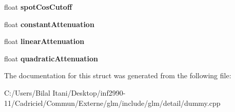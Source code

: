 \begin{DoxyCompactItemize}
\item 
float {\bfseries spot\+Cos\+Cutoff}\hypertarget{structlight_a25376f0a1e32235d50ef14edfa18bfb3}{}\label{structlight_a25376f0a1e32235d50ef14edfa18bfb3}

\item 
float {\bfseries constant\+Attenuation}\hypertarget{structlight_a788e3a9fbc05cd748dd6a181b6043892}{}\label{structlight_a788e3a9fbc05cd748dd6a181b6043892}

\item 
float {\bfseries linear\+Attenuation}\hypertarget{structlight_aea11b1222a4d5c42f5d69e31751e6fac}{}\label{structlight_aea11b1222a4d5c42f5d69e31751e6fac}

\item 
float {\bfseries quadratic\+Attenuation}\hypertarget{structlight_afe2993ec0463d57b374b8f5a27f2dfa7}{}\label{structlight_afe2993ec0463d57b374b8f5a27f2dfa7}

\end{DoxyCompactItemize}


The documentation for this struct was generated from the following file\+:\begin{DoxyCompactItemize}
\item 
C\+:/\+Users/\+Bilal Itani/\+Desktop/inf2990-\/11/\+Cadriciel/\+Commun/\+Externe/glm/include/glm/detail/dummy.\+cpp\end{DoxyCompactItemize}
